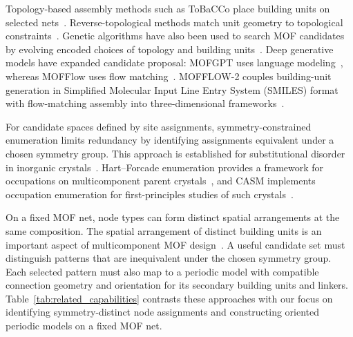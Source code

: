 \documentclass[a5paper, 10pt]{article}
\begin{document}
Topology-based assembly methods such as ToBaCCo place building units on selected nets~\cite{colon2017topologically}. Reverse-topological methods match unit geometry to topological constraints~\cite{wu2024precisionmof}. Genetic algorithms have also been used to search MOF candidates by evolving encoded choices of topology and building units~\cite{pham2025genetic}. Deep generative models have expanded candidate proposal: MOFGPT uses language modeling~\cite{badrinarayanan2025mofgpt}, whereas MOFFlow uses flow matching~\cite{Kim2024MOFFlowFM}. MOFFLOW-2 couples building-unit generation in Simplified Molecular Input Line Entry System (SMILES) format with flow-matching assembly into three-dimensional frameworks~\cite{kim2025flexiblemof}.%

For candidate spaces defined by site assignments, symmetry-constrained enumeration limits redundancy by identifying assignments equivalent under a chosen symmetry group.
This approach is established for substitutional disorder in inorganic crystals~\cite{hart2012generating}. Hart--Forcade enumeration provides a framework for occupations on multicomponent parent crystals~\cite{hart2008algorithm}, and CASM implements occupation enumeration for first-principles studies of such crystals~\cite{PUCHALA2023111897}.%

On a fixed MOF net, node types can form distinct spatial arrangements at the same composition. The spatial arrangement of distinct building units is an important aspect of multicomponent MOF design~\cite{xu2020anisotropic}. A useful candidate set must distinguish patterns that are inequivalent under the chosen symmetry group. Each selected pattern must also map to a periodic model with compatible connection geometry and orientation for its secondary building units and linkers. Table~\ref{tab:related_capabilities} contrasts these approaches with our focus on identifying symmetry-distinct node assignments and constructing oriented periodic models on a fixed MOF net. %
\end{document}
